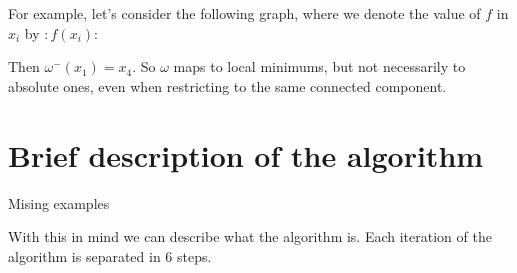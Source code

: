 \label{ex1}
\begin{example}
For example, let's consider the following graph, where we denote the
value of $f$ in $x_i$ by $:f(x_i)$:


\begin{center}
%
%
%



\end{center}

Then $\omega^-(x_1)=x_4$. So $\omega$ maps 
to local minimums, but not necessarily to absolute ones,
even when restricting to the same connected component. 


\end{example}


\section{Brief description of the algorithm}

{\color{red}
Mising examples}

With this in mind we can describe what the algorithm is. Each
iteration of the algorithm 
is separated in 6 steps.

